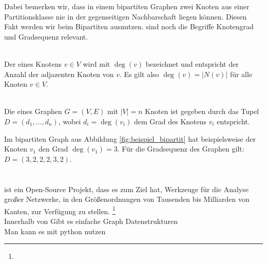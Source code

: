 \noindent
Dabei bemerken wir, dass in einem bipartiten Graphen zwei Knoten aus einer Partitionsklasse nie
in der gegenseitigen Nachbarschaft liegen können. Diesen Fakt werden wir beim Bipartiten \gc{} ausnutzen.
 sind noch die Begriffe Knotengrad und Gradsequenz relevant.
\begin{definition}[Knotengrad]~\\
Der  eines Knotens $v \in V$ wird mit $\deg(v)$ bezeichnet und entspricht der Anzahl
der adjazenten Knoten von $v$. Es gilt also $\deg(v) = |N(v)|$ für alle Knoten $v\in V$.
\end{definition}
\begin{definition}[Gradsequenz]~\\
Die  eines Graphen $G = (V,E)$ mit $|V| = n$ Knoten ist gegeben durch das Tupel
$D = (d_{1}, \dots, d_{n})$, wobei $d_{i} = \deg(v_{i})$ dem Grad des Knotens $v_{i}$ entspricht.
\end{definition}
\noindent
Im bipartiten Graph aus Abbildung \ref{fig:beispiel_bipartit} hat beispielsweise
der Knoten $v_{1}$ den Grad $\deg(v_{1}) = 3$. Für die Gradsequenz des Graphen gilt: 
$D = (3,2,2,2,3,2)$.




\section{\nk}

 ist ein Open-Source Projekt, dass es zum Ziel hat, \glqq Werkzeuge für die
Analyse großer Netzwerke, in den Größenordnungen von Tausenden bis Milliarden 
von Kanten, zur Verfügung zu stellen\grqq.
\footnote{}
\\
Innerhalb von \nk Gibt es einfache Graph Datenstrukturen 
\\
Man kann es mit python nutzen 




